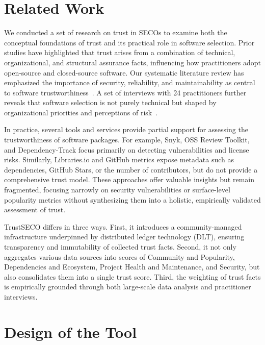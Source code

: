 \documentclass[10pt,conference]{IEEEtran}
\begin{document}
\section{Related Work}
\label{sec2:related}

We conducted a set of research on trust in SECOs to examine both the conceptual foundations of trust and its practical role in software selection. Prior studies have highlighted that trust arises from a combination of technical, organizational, and structural assurance facts, influencing how practitioners adopt open-source and closed-source software. Our systematic literature review has emphasized the importance of security, reliability, and maintainability as central to software trustworthiness~\cite{hou2023systematic}. A set of interviews with 24 practitioners further reveals that software selection is not purely technical but shaped by organizational priorities and perceptions of risk~\cite{hou2023role}.

In practice, several tools and services provide partial support for assessing the trustworthiness of software packages. For example, Snyk, OSS Review Toolkit, and Dependency-Track focus primarily on detecting vulnerabilities and license risks. Similarly, Libraries.io and GitHub metrics expose metadata such as dependencies, GitHub Stars, or the number of contributors, but do not provide a comprehensive trust model. These approaches offer valuable insights but remain fragmented, focusing narrowly on security vulnerabilities or surface-level popularity metrics without synthesizing them into a holistic, empirically validated assessment of trust.

TrustSECO differs in three ways. First, it introduces a community-managed infrastructure underpinned by distributed ledger technology (DLT), ensuring transparency and immutability of collected trust facts. Second, it not only aggregates various data sources into scores of Community and Popularity, Dependencies and Ecosystem, Project Health and Maintenance, and Security, but also consolidates them into a single trust score. Third, the weighting of trust facts is empirically grounded through both large-scale data analysis and practitioner interviews.


\section{Design of the Tool}
\label{sec3:tool}
\end{document}
